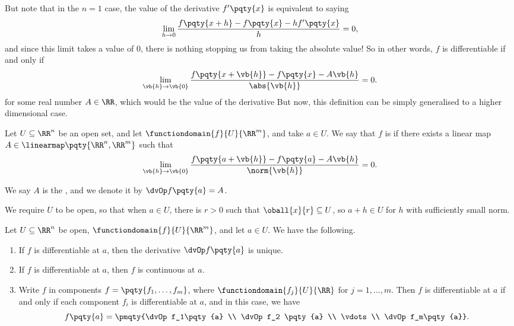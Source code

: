 But note that in the \(n = 1\) case, the value of the derivative \(f'\pqty{x}\) is equivalent to saying
\[
    \lim_{h \to 0} \frac{f\pqty{x + h} - f\pqty{x} - h f'\pqty{x}}{h} = 0,
\]
and since this limit takes a value of \(0\), there is nothing stopping us from taking the absolute value! So in other words, \(f\) is differentiable if and only if
\[
    \lim_{\vb{h} \to \vb{0}} \frac{f\pqty{x + \vb{h}} - f\pqty{x} - A\vb{h}}{\abs{\vb{h}}} = 0.
\]
for some real number \(A \in \RR\), which would be the value of the derivative  But now, this definition can be simply generalised to a higher dimensional case.

\begin{definition}[Differentiability in \(\RR^n\)]
    Let \(U \subseteq \RR^n\) be an open set, and let \(\functiondomain{f}{U}{\RR^m}\), and take \(a \in U\). We say that \(f\) is  if there exists a linear map \(A \in \linearmap\pqty{\RR^n, \RR^m}\) such that
    \[
        \lim_{\vb{h} \to \vb{0}} \frac{f\pqty{a + \vb{h}} - f\pqty{a} - A\vb{h}}{\norm{\vb{h}}} = 0.
    \]

    We say \(A\) is the , and we denote it by \(\dvOp f\pqty{a} = A\).
\end{definition}

\begin{remark}
    We require \(U\) to be open, so that when \(a \in U\), there is \(r > 0\) such that \(\oball{x}{r} \subseteq U\), so \(a + h \in U\) for \(h\) with sufficiently small norm.
\end{remark}

\begin{proposition}
    \label{prop:properties-of-derivatives}%
    Let \(U \subseteq \RR^n\) be open, \(\functiondomain{f}{U}{\RR^m}\), and let \(a \in U\). We have the following.
    \begin{enumerate}[label=(\roman*)]
        \item If \(f\) is differentiable at \(a\), then the derivative \(\dvOp f\pqty{a}\) is unique.
        \item If \(f\) is differentiable at \(a\), then \(f\) is continuous at \(a\).
        \item Write \(f\) in components \(f = \pqty{f_1, \dots, f_m}\), where \(\functiondomain{f_j}{U}{\RR}\) for \(j = 1, \dots, m\). Then \(f\) is differentiable at \(a\) if and only if each component \(f_i\) is differentiable at \(a\), and in this case, we have
        \[
            f \pqty{a} = \pmqty{\dvOp f_1\pqty{a} \\ \dvOp f_2 \pqty{a} \\ \vdots \\ \dvOp f_m\pqty{a}}.
        \]
    \end{enumerate}
\end{proposition}

